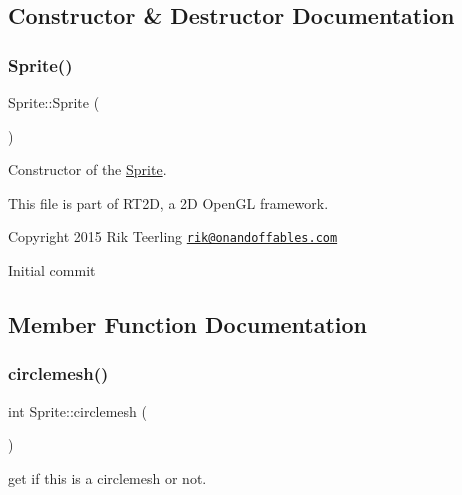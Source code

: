 \subsection{Constructor \& Destructor Documentation}
\mbox{\label{class_sprite_a12cba3ac1868418add3c4d95ce87e615}} 
\subsubsection{\texorpdfstring{Sprite()}{Sprite()}}
{\footnotesize\ttfamily Sprite\+::\+Sprite (\begin{DoxyParamCaption}{ }\end{DoxyParamCaption})}



Constructor of the \hyperlink{class_sprite}{Sprite}. 

This file is part of R\+T2D, a 2D Open\+GL framework.


\begin{DoxyItemize}
\item Copyright 2015 Rik Teerling \href{mailto:rik@onandoffables.com}{\tt rik@onandoffables.\+com}
\begin{DoxyItemize}
\item Initial commit 
\end{DoxyItemize}
\end{DoxyItemize}

\subsection{Member Function Documentation}
\mbox{\label{class_sprite_ad7827d61c0d5f95499df3bcc569cd33c}} 
\subsubsection{\texorpdfstring{circlemesh()}{circlemesh()}}
{\footnotesize\ttfamily int Sprite\+::circlemesh (\begin{DoxyParamCaption}{ }\end{DoxyParamCaption})\hspace{0.3cm}{\ttfamily [inline]}}



get if this is a circlemesh or not. 

